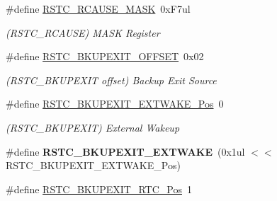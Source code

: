 \begin{DoxyCompactItemize}
\item 
\hypertarget{group___s_a_m_l21___r_s_t_c_gab206ce81cba35f3d596db3f33ec06390}{}\#define \hyperlink{group___s_a_m_l21___r_s_t_c_gab206ce81cba35f3d596db3f33ec06390}{R\+S\+T\+C\+\_\+\+R\+C\+A\+U\+S\+E\+\_\+\+M\+A\+S\+K}~0x\+F7ul\label{group___s_a_m_l21___r_s_t_c_gab206ce81cba35f3d596db3f33ec06390}

\begin{DoxyCompactList}\small\item\em (R\+S\+T\+C\+\_\+\+R\+C\+A\+U\+S\+E) M\+A\+S\+K Register \end{DoxyCompactList}\item 
\hypertarget{group___s_a_m_l21___r_s_t_c_ga4f9f8a7ec42cccdd62977c81842ab427}{}\#define \hyperlink{group___s_a_m_l21___r_s_t_c_ga4f9f8a7ec42cccdd62977c81842ab427}{R\+S\+T\+C\+\_\+\+B\+K\+U\+P\+E\+X\+I\+T\+\_\+\+O\+F\+F\+S\+E\+T}~0x02\label{group___s_a_m_l21___r_s_t_c_ga4f9f8a7ec42cccdd62977c81842ab427}

\begin{DoxyCompactList}\small\item\em (R\+S\+T\+C\+\_\+\+B\+K\+U\+P\+E\+X\+I\+T offset) Backup Exit Source \end{DoxyCompactList}\item 
\hypertarget{group___s_a_m_l21___r_s_t_c_gac984192ddb102196267a6aadd11791d8}{}\#define \hyperlink{group___s_a_m_l21___r_s_t_c_gac984192ddb102196267a6aadd11791d8}{R\+S\+T\+C\+\_\+\+B\+K\+U\+P\+E\+X\+I\+T\+\_\+\+E\+X\+T\+W\+A\+K\+E\+\_\+\+Pos}~0\label{group___s_a_m_l21___r_s_t_c_gac984192ddb102196267a6aadd11791d8}

\begin{DoxyCompactList}\small\item\em (R\+S\+T\+C\+\_\+\+B\+K\+U\+P\+E\+X\+I\+T) External Wakeup \end{DoxyCompactList}\item 
\hypertarget{group___s_a_m_l21___r_s_t_c_ga998d14b0a1acd9d06f784eec17ea4ad7}{}\#define {\bfseries R\+S\+T\+C\+\_\+\+B\+K\+U\+P\+E\+X\+I\+T\+\_\+\+E\+X\+T\+W\+A\+K\+E}~(0x1ul $<$$<$ R\+S\+T\+C\+\_\+\+B\+K\+U\+P\+E\+X\+I\+T\+\_\+\+E\+X\+T\+W\+A\+K\+E\+\_\+\+Pos)\label{group___s_a_m_l21___r_s_t_c_ga998d14b0a1acd9d06f784eec17ea4ad7}

\item 
\hypertarget{group___s_a_m_l21___r_s_t_c_ga66320413c232807e6b4d60bccb4cf3b2}{}\#define \hyperlink{group___s_a_m_l21___r_s_t_c_ga66320413c232807e6b4d60bccb4cf3b2}{R\+S\+T\+C\+\_\+\+B\+K\+U\+P\+E\+X\+I\+T\+\_\+\+R\+T\+C\+\_\+\+Pos}~1\label{group___s_a_m_l21___r_s_t_c_ga66320413c232807e6b4d60bccb4cf3b2}


\end{DoxyCompactItemize}
